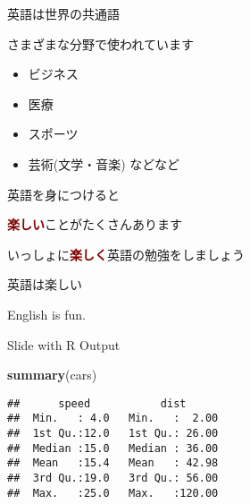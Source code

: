 \documentclass[
  ignorenonframetext,
  aspectratio=169,
  xcolor=dvipsnames]{beamer}
\newenvironment{Shaded}{\begin{snugshade}}{\end{snugshade}}
\newcommand{\FunctionTok}[1]{\textcolor[rgb]{0.13,0.29,0.53}{\textbf{#1}}}
\newcommand{\NormalTok}[1]{#1}
\providecommand{\tightlist}{%
  \setlength{\itemsep}{0pt}\setlength{\parskip}{0pt}}
\let\oldShaded\Shaded
\let\endoldShaded\endShaded
\renewenvironment{Shaded}{\footnotesize\oldShaded}{\endoldShaded}
\begin{document}
\begin{frame}{英語は世界の共通語}
\label{ux82f1ux8a9eux306fux4e16ux754cux306eux5171ux901aux8a9e}
\Large

さまざまな分野で使われています

\begin{itemize}[<+->]
\tightlist
\item
  ビジネス
\item
  医療
\item
  スポーツ
\item
  芸術(文学・音楽) などなど
\end{itemize}
\end{frame}

\begin{frame}{英語を身につけると}
\label{ux82f1ux8a9eux3092ux8eabux306bux3064ux3051ux308bux3068}
\Large

\textcolor{Maroon}{\bfseries 楽しい}ことがたくさんあります\pause

いっしょに\textcolor{Maroon}{\bfseries 楽しく}英語の勉強をしましょう
\end{frame}

\begin{frame}{英語は楽しい}
\label{ux82f1ux8a9eux306fux697dux3057ux3044}
\Huge

\centering

English is fun.
\end{frame}

\begin{frame}{}
\label{section-4}
\end{frame}

\begin{frame}[fragile]{Slide with R Output}
\label{slide-with-r-output}
\begin{Shaded}
\begin{Highlighting}[]
\FunctionTok{summary}\NormalTok{(cars)}
\end{Highlighting}
\end{Shaded}

\begin{verbatim}
##      speed           dist       
##  Min.   : 4.0   Min.   :  2.00  
##  1st Qu.:12.0   1st Qu.: 26.00  
##  Median :15.0   Median : 36.00  
##  Mean   :15.4   Mean   : 42.98  
##  3rd Qu.:19.0   3rd Qu.: 56.00  
##  Max.   :25.0   Max.   :120.00
\end{verbatim}
\end{frame}
\end{document}
